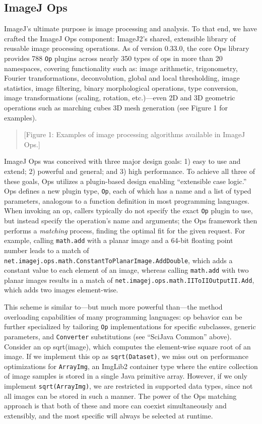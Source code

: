 \documentclass{bmcart}
\begin{document}
\subsection*{ImageJ Ops}

ImageJ's ultimate purpose is image processing and analysis. To that end, we
have crafted the ImageJ Ops component: ImageJ2's shared, extensible library of
reusable image processing operations. As of version 0.33.0, the core Ops
library provides 788 \texttt{Op} plugins across nearly 350 types of ops in more
than 20 namespaces, covering functionality such as: image arithmetic,
trigonometry, Fourier transformations, deconvolution, global and local
thresholding, image statistics, image filtering, binary morphological
operations, type conversion, image transformations (scaling, rotation,
etc.)---even 2D and 3D geometric operations such as marching cubes 3D mesh
generation (see Figure 1 for examples).

\begin{quote}
[Figure 1: Examples of image processing algorithms available in ImageJ Ops.]
\end{quote}

ImageJ Ops was conceived with three major design goals: 1) easy to use and
extend; 2) powerful and general; and 3) high performance. To achieve all three
of these goals, Ops utilizes a plugin-based design enabling ``extensible case
logic.'' Ops defines a new plugin type, \texttt{Op}, each of which has a name
and a list of typed parameters, analogous to a function definition in most
programming languages. When invoking an op, callers typically do not specify
the exact \texttt{Op} plugin to use, but instead specify the operation's name
and arguments; the Ops framework then performs a \textit{matching} process,
finding the optimal fit for the given request. For example, calling
\texttt{math.add} with a planar image and a 64-bit floating point number leads
to a match of \texttt{net.imagej.ops.math.ConstantToPlanarImage.AddDouble},
which adds a constant value to each element of an image, whereas calling
\texttt{math.add} with two planar images results in a match of
\texttt{net.imagej.ops.math.IIToIIOutputII.Add}, which adds two images
element-wise.

This scheme is similar to---but much more powerful than---the method
overloading capabilities of many programming languages: op behavior can be
further specialized by tailoring \texttt{Op} implementations for specific
subclasses, generic parameters, and \texttt{Converter} substitutions (see
``SciJava Common'' above). Consider an op sqrt(image), which computes the
element-wise square root of an image. If we implement this op as
\texttt{sqrt(Dataset)}, we miss out on performance optimizations for
\texttt{ArrayImg}, an ImgLib2 container type where the entire collection of
image samples is stored in a single Java primitive array. However, if we only
implement \texttt{sqrt(ArrayImg)}, we are restricted in supported data types,
since not all images can be stored in such a manner. The power of the Ops
matching approach is that both of these and more can coexist simultaneously and
extensibly, and the most specific will always be selected at runtime.
\end{document}
